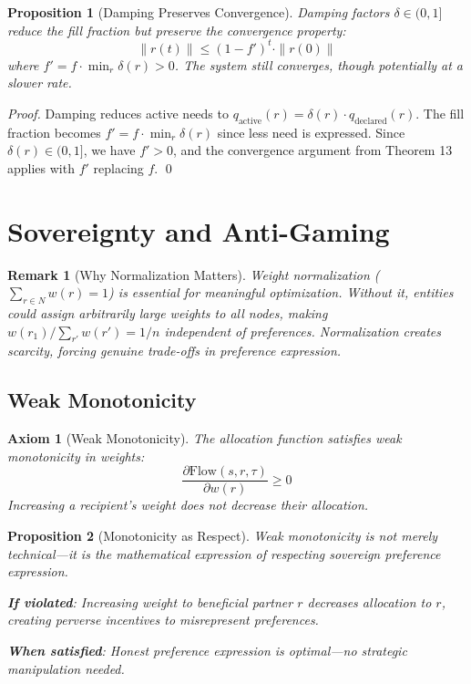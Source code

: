 \documentclass[11pt]{article}
\newtheorem{proposition}{Proposition}
\newtheorem{remark}{Remark}
\newtheorem{axiom}{Axiom}
\begin{document}
\begin{proposition}[Damping Preserves Convergence]
Damping factors $\delta \in (0, 1]$ reduce the fill fraction but preserve the convergence property:
\[
\|r(t)\| \leq (1-f')^t \cdot \|r(0)\|
\]
where $f' = f \cdot \min_r \delta(r) > 0$. The system still converges, though potentially at a slower rate.
\end{proposition}

\begin{proof}
Damping reduces active needs to $q_{\text{active}}(r) = \delta(r) \cdot q_{\text{declared}}(r)$. The fill fraction becomes $f' = f \cdot \min_r \delta(r)$ since less need is expressed. Since $\delta(r) \in (0, 1]$, we have $f' > 0$, and the convergence argument from Theorem 13 applies with $f'$ replacing $f$. \qed
\end{proof}

\section{Sovereignty and Anti-Gaming}

\begin{remark}[Why Normalization Matters]
Weight normalization ($\sum_{r \in N} w(r) = 1$) is essential for meaningful optimization. Without it, entities could assign arbitrarily large weights to all nodes, making $w(r_1)/\sum_{r'} w(r') = 1/n$ independent of preferences. Normalization creates scarcity, forcing genuine trade-offs in preference expression.
\end{remark}

\subsection{Weak Monotonicity}

\begin{axiom}[Weak Monotonicity]
\label{ax:weak-monotonicity}
The allocation function satisfies weak monotonicity in weights:
\[
\frac{\partial \text{Flow}(s, r, \tau)}{\partial w(r)} \geq 0
\]
Increasing a recipient's weight does not decrease their allocation.
\end{axiom}

\begin{proposition}[Monotonicity as Respect]
Weak monotonicity is not merely technical—it is the mathematical expression of respecting sovereign preference expression.

\textbf{If violated}: Increasing weight to beneficial partner $r$ decreases allocation to $r$, creating perverse incentives to misrepresent preferences.

\textbf{When satisfied}: Honest preference expression is optimal—no strategic manipulation needed.
\end{proposition}
\end{document}
